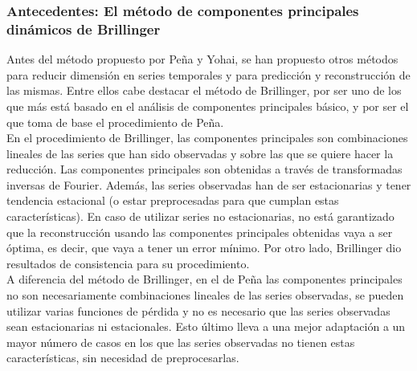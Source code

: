 \subsubsection{Antecedentes: El método de componentes principales dinámicos de Brillinger}

Antes del método propuesto por Peña y Yohai, se han propuesto otros métodos para reducir dimensión en series temporales y para predicción y reconstrucción de las mismas. Entre ellos cabe destacar el método de Brillinger, por ser uno de los que más está basado en el análisis de componentes principales básico, y por ser el que toma de base el procedimiento de Peña.\\

En el procedimiento de Brillinger, las componentes principales son combinaciones lineales de las series que han sido observadas y sobre las que se quiere hacer la reducción. Las componentes principales son obtenidas a través de transformadas inversas de Fourier. Además, las series observadas han de ser estacionarias y tener tendencia estacional (o estar preprocesadas para que cumplan estas características). En caso de utilizar series no estacionarias, no está garantizado que la reconstrucción usando las componentes principales obtenidas vaya a ser óptima, es decir, que vaya a tener un error mínimo. Por otro lado, Brillinger dio resultados de consistencia para su procedimiento.\\

A diferencia del método de Brillinger, en el de Peña las componentes principales no son necesariamente combinaciones lineales de las series observadas, se pueden utilizar varias funciones de pérdida y no es necesario que las series observadas sean estacionarias ni estacionales. Esto último lleva a una mejor adaptación a un mayor número de casos en los que las series observadas no tienen estas características, sin necesidad de preprocesarlas.\\

